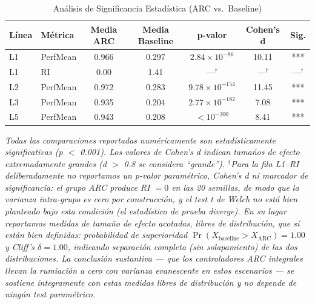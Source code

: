 \documentclass{article}
\begin{document}
\begin{table}[htbp]
\centering
\caption{Análisis de Significancia Estadística (ARC vs.\ Baseline)}
\label{tab:significance}
\begin{tabular}{@{}llccccc@{}}
\toprule
Línea & Métrica & Media ARC & Media Baseline & p-valor & Cohen's d & Sig. \\ \midrule
L1 & PerfMean & 0.966 & 0.297 & $2.84 \times 10^{-86}$ & 10.11 & *** \\
L1 & RI & 0.00 & 1.41 & ---$^\dagger$ & ---$^\dagger$ & ---$^\dagger$ \\
L2 & PerfMean & 0.972 & 0.283 & $9.78 \times 10^{-154}$ & 11.45 & *** \\
L3 & PerfMean & 0.935 & 0.204 & $2.77 \times 10^{-182}$ & 7.08 & *** \\
L5 & PerfMean & 0.943 & 0.208 & $< 10^{-200}$ & 8.41 & *** \\ \bottomrule
\end{tabular}
\end{table}

\textit{Todas las comparaciones reportadas numéricamente son estadísticamente significativas (p $<$ 0.001). Los valores de Cohen's d indican tamaños de efecto extremadamente grandes (d $>$ 0.8 se considera ``grande''). $^\dagger$Para la fila L1--RI deliberadamente no reportamos un p-valor paramétrico, Cohen's d ni marcador de significancia: el grupo ARC produce RI $= 0$ en las 20 semillas, de modo que la varianza intra-grupo es cero por construcción, y el test t de Welch no está bien planteado bajo esta condición (el estadístico de prueba diverge). En su lugar reportamos medidas de tamaño de efecto acotadas, libres de distribución, que sí están bien definidas: probabilidad de superioridad $\Pr(X_{\text{baseline}} > X_{\text{ARC}}) = 1.00$ y Cliff's $\delta = 1.00$, indicando separación completa (sin solapamiento) de las dos distribuciones. La conclusión sustantiva --- que los controladores ARC integrales llevan la rumiación a cero con varianza evanescente en estos escenarios --- se sostiene íntegramente con estas medidas libres de distribución y no depende de ningún test paramétrico.}
\end{document}
